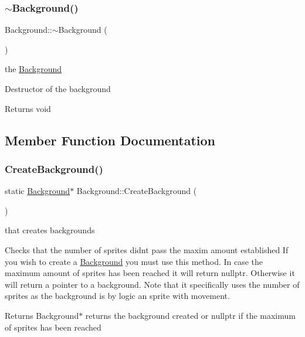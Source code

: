 \subsubsection{\texorpdfstring{$\sim$\+Background()}{~Background()}}
{\footnotesize\ttfamily Background\+::$\sim$\+Background (\begin{DoxyParamCaption}{ }\end{DoxyParamCaption})}

the \hyperlink{class_background}{Background}

Destructor of the background

\begin{DoxyReturn}{Returns}
void 
\end{DoxyReturn}


\subsection{Member Function Documentation}
\mbox{\label{class_background_aafc5996195781b2d4bff7d170792425d}} 
\subsubsection{\texorpdfstring{Create\+Background()}{CreateBackground()}}
{\footnotesize\ttfamily static \hyperlink{class_background}{Background}$\ast$ Background\+::\+Create\+Background (\begin{DoxyParamCaption}{ }\end{DoxyParamCaption})\hspace{0.3cm}{\ttfamily [static]}}

that creates backgrounds

Checks that the number of sprites didn\textquotesingle{}t pass the maxim amount established If you wish to create a \hyperlink{class_background}{Background} you must use this method. In case the maximum amount of sprites has been reached it will return nullptr. Otherwise it will return a pointer to a background. Note that it specifically uses the number of sprites as the background is by logic an sprite with movement.

\begin{DoxyReturn}{Returns}
Background$\ast$ returns the background created or nullptr if the maximum of sprites has been reached 
\end{DoxyReturn}
\mbox{\label{class_background_ae3d10fe0882df48b0e1e861a7e69f37f}} 
